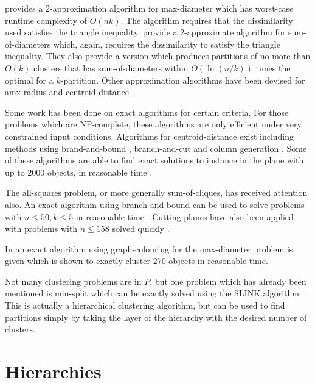 \documentclass[a4paper]{report}
\begin{document}
\citet{gonzalez1985clustering} provides a 2-approximation algorithm for
max-diameter which has worst-case runtime complexity of $O(nk)$.  The
algorithm requires that the dissimilarity used satisfies the triangle
inequality.  \citet{doddi2000approximation} provide a 2-approximate algorithm
for sum-of-diameters which, again, requires the dissimilarity to satisfy the
triangle inequality.  They also provide a version which produces partitions of
no more than $O(k)$ clusters that has sum-of-diameters within $O(\ln(n/k))$
times the optimal for a $k$-partition.  Other approximation algorithms have
been devised for amx-radius \citep{wirth04approx} and centroid-distance
\citep{cormode2008approximation}.

Some work has been done on exact algorithms for certain criteria.  For those
problems which are NP-complete, these algorithms are only efficient under very
constrained input conditions.  Algorithms for centroid-distance exist
including methods using brand-and-bound \citep{brusco2006repetitive},
branch-and-cut \citep{aloise09exact} and column generation
\citep{merle1999interior}.  Some of these algorithms are able to find exact
solutions to instance in the plane with up to 2000 objects, in reasonable time
\citep{aloise09exact}.

The all-squares problem, or more generally sum-of-cliques, has received
attention also.  An exact algorithm using branch-and-bound
\citep{klein1991optimal} can be used to solve problems with $n \leq 50, k \leq
5$ in reasonable time \citep{hansen1997mathprog}.  Cutting planes have also
been applied with problems with $n \leq 158$ solved quickly
\citep{hansen1997mathprog,palubeckis1997branch}.

In \citet{hansen1978complete} an exact algorithm using graph-colouring for the
max-diameter problem is given which is shown to exactly cluster 270 objects in
reasonable time.

Not many clustering problems are in $P$, but one problem which has already
been mentioned is min-split which can be exactly solved using the SLINK
algorithm \citep{johnson67hierarchical,sibson1973slink}.  This is actually a
hierarchical clustering algorithm, but can be used to find partitions simply
by taking the layer of the hierarchy with the desired number of clusters.

\section{Hierarchies}
\label{sec:hierarchies}
\end{document}
